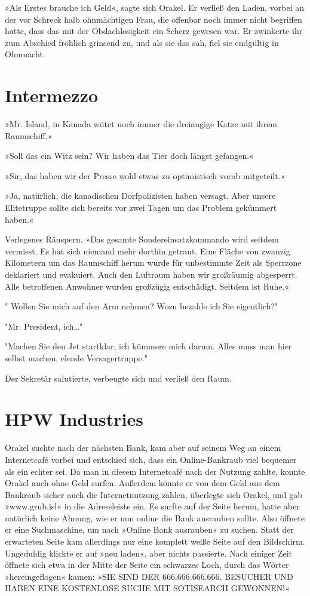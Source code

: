 »Als Erstes brauche ich Geld«, sagte sich Orakel. Er verließ den Laden, vorbei an der vor Schreck halb ohnmächtigen Frau, die offenbar noch immer nicht begriffen hatte, dass das mit der Obdachlosigkeit ein Scherz gewesen war. Er zwinkerte ihr zum Abschied fröhlich grinsend zu, und als sie das sah, fiel sie endgültig in Ohnmacht.


\chapter{Intermezzo}

»Mr. Island, in Kanada wütet noch immer die dreiäugige Katze mit ihrem Raumschiff.«

»Soll das ein Witz sein? Wir haben das Tier doch längst gefangen.«

»Sir, das haben wir der Presse wohl etwas zu optimistisch vorab mitgeteilt.«

»Ja, natürlich, die kanadischen Dorfpolizisten haben versagt. Aber unsere Elitetruppe sollte sich bereits vor zwei Tagen um das Problem gekümmert haben.«

Verlegenes Räuspern. »Das gesamte Sondereinsatzkommando wird seitdem vermisst. Es hat sich niemand mehr dorthin getraut. Eine Fläche von zwanzig Kilometern um das Raumschiff herum wurde für unbestimmte Zeit als Sperrzone deklariert und evakuiert. Auch den Luftraum haben wir großräumig abgesperrt. Alle betroffenen Anwohner wurden großzügig entschädigt. Seitdem ist Ruhe.«

" Wollen Sie mich auf den Arm nehmen? Wozu bezahle ich Sie eigentlich?"

"Mr. President, ich…"

"Machen Sie den Jet startklar, ich kümmere mich darum. Alles muss man hier selbst machen, elende Versagertruppe."

Der Sekretär salutierte, verbeugte sich und verließ den Raum.


\chapter{HPW Industries}

Orakel suchte nach der nächsten Bank, kam aber auf seinem Weg an einem Internetcafé vorbei und entschied sich, dass ein Online-Bankraub viel bequemer als ein echter sei. Da man in diesem Internetcafé nach der Nutzung zahlte, konnte Orakel auch ohne Geld surfen. Außerdem könnte er von dem Geld aus dem Bankraub sicher auch die Internetnutzung zahlen, überlegte sich Orakel, und gab »www.grub.isl« in die Adressleiste ein. Es surfte auf der Seite herum, hatte aber natürlich keine Ahnung, wie er nun online die Bank ausrauben sollte. Also öffnete er eine Suchmaschine, um nach »Online Bank ausrauben« zu suchen. Statt der erwarteten Seite kam allerdings nur eine komplett weiße Seite auf den Bildschirm. Ungeduldig klickte er auf »neu laden«, aber nichts passierte. Nach einiger Zeit öffnete sich etwa in der Mitte der Seite ein schwarzes Loch, durch das Wörter »hereingeflogen« kamen: »SIE SIND DER 666.666.666.666. BESUCHER UND HABEN EINE KOSTENLOSE SUCHE MIT SOTISEARCH GEWONNEN!«

